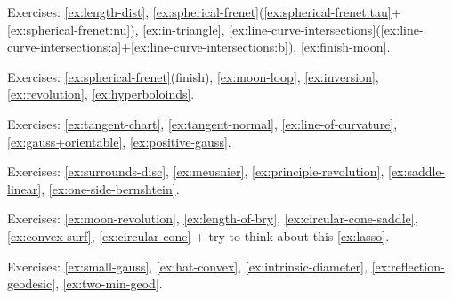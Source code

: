 Exercises:
\ref{ex:length-dist},
\ref{ex:spherical-frenet}(\ref{ex:spherical-frenet:tau}+\ref{ex:spherical-frenet:nu}),
\ref{ex:in-triangle},
\ref{ex:line-curve-intersections}(\ref{ex:line-curve-intersections:a}+\ref{ex:line-curve-intersections:b}),
\ref{ex:finish-moon}.

Exercises:
\ref{ex:spherical-frenet}(finish),
\ref{ex:moon-loop},
\ref{ex:inversion},
\ref{ex:revolution},
\ref{ex:hyperboloinds}.

Exercises:
\ref{ex:tangent-chart},
\ref{ex:tangent-normal},
\ref{ex:line-of-curvature},
\ref{ex:gauss+orientable},
\ref{ex:positive-gauss}.

Exercises:
\ref{ex:surrounds-disc},
\ref{ex:meusnier},
\ref{ex:principle-revolution},
\ref{ex:saddle-linear},
\ref{ex:one-side-bernshtein}.

Exercises:
\ref{ex:moon-revolution}, 
\ref{ex:length-of-bry},
\ref{ex:circular-cone-saddle},
\ref{ex:convex-surf},
\ref{ex:circular-cone} 
+ try to think about this \ref{ex:lasso}.

Exercises:
\ref{ex:small-gauss},
\ref{ex:hat-convex},
\ref{ex:intrinsic-diameter},
\ref{ex:reflection-geodesic},
\ref{ex:two-min-geod}.
